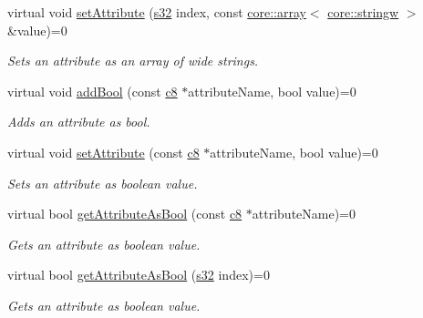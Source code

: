 \begin{DoxyCompactItemize}
virtual void \hyperlink{classirr_1_1io_1_1IAttributes_aa4e2e82c29e917cac49d92ac30628099}{set\+Attribute} (\hyperlink{namespaceirr_ac66849b7a6ed16e30ebede579f9b47c6}{s32} index, const \hyperlink{classirr_1_1core_1_1array}{core\+::array}$<$ \hyperlink{namespaceirr_1_1core_a5aedb62cb47cf01d1c548ab5e6344d2d}{core\+::stringw} $>$ \&value)=0
\begin{DoxyCompactList}\small\item\em Sets an attribute as an array of wide strings. \end{DoxyCompactList}\item 
\mbox{\label{classirr_1_1io_1_1IAttributes_a3335f912c0dfcf0e88f662796314123b}} 
virtual void \hyperlink{classirr_1_1io_1_1IAttributes_a3335f912c0dfcf0e88f662796314123b}{add\+Bool} (const \hyperlink{namespaceirr_a9395eaea339bcb546b319e9c96bf7410}{c8} $\ast$attribute\+Name, bool value)=0
\begin{DoxyCompactList}\small\item\em Adds an attribute as bool. \end{DoxyCompactList}\item 
\mbox{\label{classirr_1_1io_1_1IAttributes_a1c145485baeebae6066cee83af3a6b31}} 
virtual void \hyperlink{classirr_1_1io_1_1IAttributes_a1c145485baeebae6066cee83af3a6b31}{set\+Attribute} (const \hyperlink{namespaceirr_a9395eaea339bcb546b319e9c96bf7410}{c8} $\ast$attribute\+Name, bool value)=0
\begin{DoxyCompactList}\small\item\em Sets an attribute as boolean value. \end{DoxyCompactList}\item 
virtual bool \hyperlink{classirr_1_1io_1_1IAttributes_a197407f5b0f1d0c1aefab3e1b8d7c02d}{get\+Attribute\+As\+Bool} (const \hyperlink{namespaceirr_a9395eaea339bcb546b319e9c96bf7410}{c8} $\ast$attribute\+Name)=0
\begin{DoxyCompactList}\small\item\em Gets an attribute as boolean value. \end{DoxyCompactList}\item 
virtual bool \hyperlink{classirr_1_1io_1_1IAttributes_acf9dc477c8610923c373d2ad15ff7752}{get\+Attribute\+As\+Bool} (\hyperlink{namespaceirr_ac66849b7a6ed16e30ebede579f9b47c6}{s32} index)=0
\begin{DoxyCompactList}\small\item\em Gets an attribute as boolean value. \end{DoxyCompactList}\item 

\end{DoxyCompactItemize}
